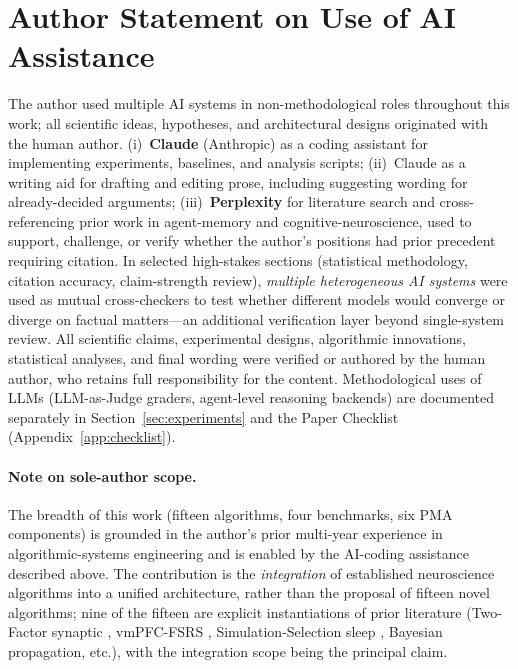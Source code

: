 \documentclass{article}
\begin{document}
\section*{Author Statement on Use of AI Assistance}
\label{sec:author-statement}

The author used multiple AI systems in non-methodological roles
throughout this work; all scientific ideas, hypotheses, and
architectural designs originated with the human author.
(i)~\textbf{Claude} (Anthropic) as a coding assistant for implementing
experiments, baselines, and analysis scripts; (ii)~Claude as a writing
aid for drafting and editing prose, including suggesting wording for
already-decided arguments; (iii)~\textbf{Perplexity} for literature
search and cross-referencing prior work in agent-memory and
cognitive-neuroscience, used to support, challenge, or verify whether
the author's positions had prior precedent requiring citation. In
selected high-stakes sections (statistical methodology, citation
accuracy, claim-strength review), \emph{multiple heterogeneous AI
systems} were used as mutual cross-checkers to test whether different
models would converge or diverge on factual matters---an additional
verification layer beyond single-system review. All scientific claims,
experimental designs, algorithmic innovations, statistical analyses,
and final wording were verified or authored by the human author, who
retains full responsibility for the content. Methodological uses of
LLMs (LLM-as-Judge graders, agent-level reasoning backends) are
documented separately in Section~\ref{sec:experiments} and the Paper
Checklist (Appendix~\ref{app:checklist}).

\paragraph{Note on sole-author scope.} The breadth of this work
(fifteen algorithms, four benchmarks, six PMA components) is grounded
in the author's prior multi-year experience in algorithmic-systems
engineering and is enabled by the AI-coding assistance described
above. The contribution is the \emph{integration} of established
neuroscience algorithms into a unified architecture, rather than
the proposal of fifteen novel algorithms; nine of the fifteen are
explicit instantiations of prior literature (Two-Factor synaptic
\citep{zenke2025}, vmPFC-FSRS \citep{zou2025}, Simulation-Selection
sleep \citep{chen2025}, Bayesian propagation, etc.), with the
integration scope being the principal claim.
\end{document}
